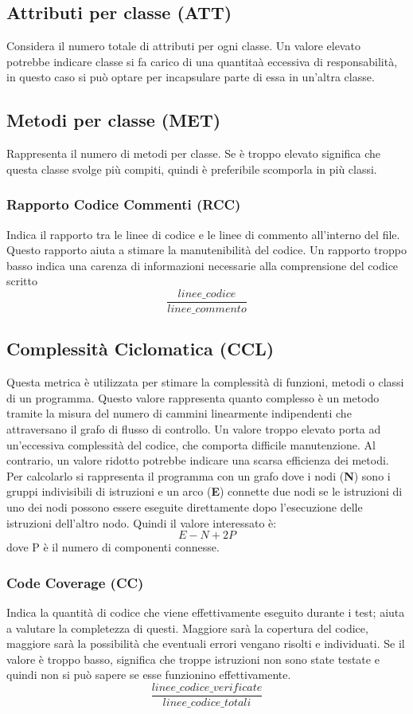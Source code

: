 \subsection{Attributi per classe (ATT)}
Considera il numero totale di attributi per ogni classe. Un valore elevato potrebbe indicare classe si fa carico di una quantitaà eccessiva di responsabilità, in questo caso si può optare per incapsulare parte di essa in un'altra classe.

\subsection{Metodi per classe (MET)}
Rappresenta il numero di metodi per classe. Se è troppo elevato significa che questa classe svolge più compiti, quindi è preferibile scomporla in più classi.

\subsubsection{Rapporto Codice Commenti (RCC)}
Indica il rapporto tra le linee di codice e le linee di commento all'interno del file. Questo rapporto aiuta a stimare la manutenibilità del codice. Un rapporto troppo basso indica una carenza di informazioni necessarie alla comprensione del codice scritto
\[\frac{linee\_codice}{linee\_commento}\]

\subsection{Complessità Ciclomatica (CCL)}
Questa metrica è utilizzata per stimare la complessità di funzioni, metodi o classi di un programma. Questo valore rappresenta quanto complesso è un metodo tramite la misura del numero di cammini linearmente indipendenti che attraversano il grafo di flusso di controllo. Un valore troppo elevato porta ad un’eccessiva complessità del codice, che comporta difficile manutenzione. Al contrario, un valore ridotto potrebbe indicare una scarsa efficienza dei metodi. Per calcolarlo si rappresenta il programma con un grafo dove i  nodi (\textbf{N}) sono i gruppi indivisibili di istruzioni e un arco (\textbf{E}) connette due nodi se le istruzioni di uno dei nodi possono essere eseguite direttamente dopo l’esecuzione delle istruzioni dell’altro nodo. Quindi il valore interessato è:
\[E-N+2P\] 
dove P è il numero di componenti connesse.
\subsubsection{Code Coverage (CC)}
Indica la quantità di codice che viene effettivamente eseguito durante i test; aiuta a valutare la completezza di questi. Maggiore sarà la copertura del codice, maggiore sarà la possibilità che eventuali errori vengano risolti e individuati. Se il valore è troppo basso, significa che troppe istruzioni non sono state testate e quindi non si può sapere se esse funzionino effettivamente.
\[\frac{linee\_codice\_verificate}{linee\_codice\_totali}\]

